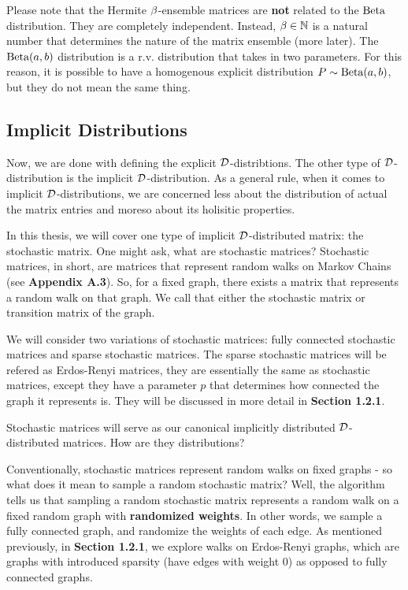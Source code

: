 \begin{warning}[$\b$-Notation]
Please note that the Hermite $\b$-ensemble matrices are \textbf{not} related to the $\text{Beta}$ distribution. They are completely independent.
Instead, $\beta \in \mathbb{N}$ is a natural number that determines the nature of the matrix ensemble (more later). The $\text{Beta}(a,b)$ distribution is a r.v. distribution that
takes in two parameters. For this reason, it is possible to have a homogenous explicit distribution $P \sim \text{Beta}(a,b)$, but they do not mean the same thing.
\end{warning}



\subsection{Implicit Distributions}

Now, we are done with defining the explicit $\mathcal{D}$-distribtions. The other type of $\mathcal{D}$-distribution is the implicit $\mathcal{D}$-distribution.
As a general rule, when it comes to implicit $\mathcal{D}$-distributions, we are concerned less about the distribution of actual the matrix entries and moreso about its holisitic properties.

In this thesis, we will cover one type of implicit $\mathcal{D}$-distributed matrix: the stochastic matrix. One might ask, what are stochastic matrices?
Stochastic matrices, in short, are matrices that represent random walks on Markov Chains (see \textbf{Appendix A.3}). So, for a fixed graph, there exists a matrix that represents a random walk on that graph.
We call that either the stochastic matrix or transition matrix of the graph.

We will consider two variations of stochastic matrices: fully connected stochastic matrices and sparse stochastic matrices.
The sparse stochastic matrices will be refered as Erdos-Renyi matrices, they are essentially the same as stochastic matrices, except they have a parameter $p$ that
determines how connected the graph it represents is. They will be discussed in more detail in \textbf{Section 1.2.1}.


Stochastic matrices will serve as our canonical implicitly distributed $\mathcal{D}$-distributed matrices. How are they distributions?

Conventionally, stochastic matrices represent random walks on fixed graphs - so what does it mean to sample a random stochastic matrix?
Well, the algorithm tells us that sampling a random stochastic matrix represents a random walk on a fixed random graph with \textbf{randomized weights}.
In other words, we sample a fully connected graph, and randomize the weights of each edge. As mentioned previously, in \textbf{Section 1.2.1}, we explore walks on Erdos-Renyi graphs,
which are graphs with introduced sparsity (have edges with weight 0) as opposed to fully connected graphs.

